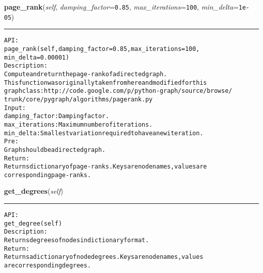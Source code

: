     \label{coinor:gimpy:graph:Graph:page_rank}

    \vspace{0.5ex}

\hspace{.8\funcindent}\begin{boxedminipage}{\funcwidth}

    \raggedright \textbf{page\_rank}(\textit{self}, \textit{damping\_factor}={\tt 0.85}, \textit{max\_iterations}={\tt 100}, \textit{min\_delta}={\tt 1e-05})

    \vspace{-1.5ex}

    \rule{\textwidth}{0.5\fboxrule}
\setlength{\parskip}{2ex}
\begin{alltt}

API:
    page\_rank(self, damping\_factor=0.85, max\_iterations=100,
          min\_delta=0.00001)
Description:
    Compute and return the page-rank of a directed graph.
    This function was originally taken from here and modified for this
    graph class: http://code.google.com/p/python-graph/source/browse/
    trunk/core/pygraph/algorithms/pagerank.py
Input:
    damping\_factor: Damping factor.
    max\_iterations: Maximum number of iterations.
    min\_delta: Smallest variation required to have a new iteration.
Pre:
    Graph should be a directed graph.
Return:
    Returns dictionary of page-ranks. Keys are node names, values are
    corresponding page-ranks.
\end{alltt}

\setlength{\parskip}{1ex}
    \end{boxedminipage}

    \label{coinor:gimpy:graph:Graph:get_degrees}

    \vspace{0.5ex}

\hspace{.8\funcindent}\begin{boxedminipage}{\funcwidth}

    \raggedright \textbf{get\_degrees}(\textit{self})

    \vspace{-1.5ex}

    \rule{\textwidth}{0.5\fboxrule}
\setlength{\parskip}{2ex}
\begin{alltt}

API:
    get\_degree(self)
Description:
    Returns degrees of nodes in dictionary format.
Return:
    Returns a dictionary of node degrees. Keys are node names, values
    are corresponding degrees.
\end{alltt}

\setlength{\parskip}{1ex}
    \end{boxedminipage}


